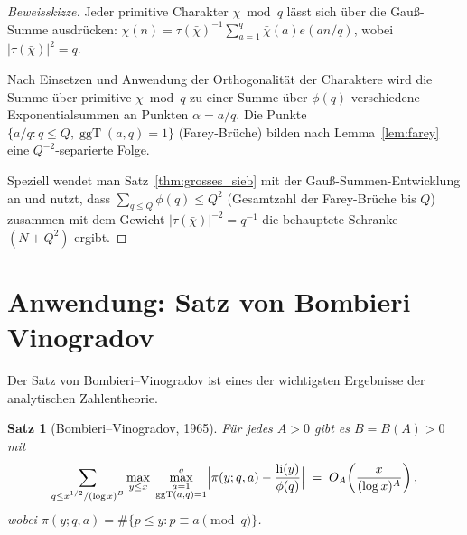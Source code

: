 \documentclass[12pt,a4paper]{amsart}
\newtheorem{theorem}{Satz}[section]
\theoremstyle{definition}
\DeclareMathOperator{\ggT}{ggT}
\DeclareMathOperator{\li}{li}
\newcommand{\eexp}[1]{e\!\left(#1\right)}
\begin{document}
\begin{proof}[Beweisskizze]
  Jeder primitive Charakter $\chi\bmod q$ lässt sich über die Gauß-Summe
  ausdrücken: $\chi(n) = \tau(\bar\chi)^{-1}\sum_{a=1}^{q}\bar\chi(a)
  \eexp{an/q}$, wobei $|\tau(\bar\chi)|^2 = q$.

  Nach Einsetzen und Anwendung der Orthogonalität der Charaktere wird die
  Summe über primitive $\chi\bmod q$ zu einer Summe über $\phi(q)$
  verschiedene Exponentialsummen an Punkten $\alpha = a/q$.  Die Punkte
  $\{a/q : q \leq Q, \ggT(a,q) = 1\}$ (Farey-Brüche) bilden nach
  Lemma~\ref{lem:farey} eine $Q^{-2}$-separierte Folge.

  Speziell wendet man Satz~\ref{thm:grosses_sieb} mit der Gauß-Summen-Entwicklung
  an und nutzt, dass $\sum_{q \leq Q}\phi(q) \leq Q^2$ (Gesamtzahl der
  Farey-Brüche bis $Q$) zusammen mit dem Gewicht $|\tau(\bar\chi)|^{-2} = q^{-1}$
  die behauptete Schranke $(N+Q^2)$ ergibt.  \qedhere
\end{proof}

\section{Anwendung: Satz von Bombieri--Vinogradov}

Der Satz von Bombieri--Vinogradov ist eines der wichtigsten Ergebnisse der
analytischen Zahlentheorie.

\begin{theorem}[Bombieri--Vinogradov, 1965]\label{thm:bombieri_vinogradov}
  Für jedes $A > 0$ gibt es $B = B(A) > 0$ mit
  \[
    \sum_{\substack{q \leq x^{1/2}/(\log x)^{B}}}
    \max_{y \leq x}\;\max_{\substack{a=1\\\ggT(a,q)=1}}^{q}
    \Bigl|\pi(y;q,a) - \frac{\li(y)}{\phi(q)}\Bigr|
    \;=\;
    O_A\!\left(\frac{x}{(\log x)^{A}}\right),
  \]
  wobei $\pi(y;q,a) = \#\{p \leq y : p \equiv a \pmod q\}$.
\end{theorem}
\end{document}
